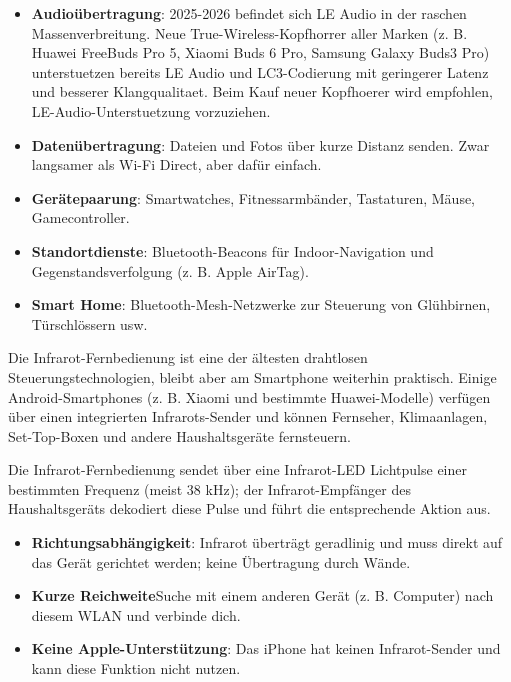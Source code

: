 
\begin{itemize}
  \item \textbf{Audioübertragung}: 2025-2026 befindet sich LE Audio in der raschen Massenverbreitung. Neue True-Wireless-Kopfhorrer aller Marken (z. B. Huawei FreeBuds Pro 5, Xiaomi Buds 6 Pro, Samsung Galaxy Buds3 Pro) unterstuetzen bereits LE Audio und LC3-Codierung mit geringerer Latenz und besserer Klangqualitaet. Beim Kauf neuer Kopfhoerer wird empfohlen, LE-Audio-Unterstuetzung vorzuziehen.
  \item \textbf{Datenübertragung}: Dateien und Fotos über kurze Distanz senden. Zwar langsamer als Wi-Fi Direct, aber dafür einfach.
  \item \textbf{Gerätepaarung}: Smartwatches, Fitnessarmbänder, Tastaturen, Mäuse, Gamecontroller.
  \item \textbf{Standortdienste}: Bluetooth-Beacons für Indoor-Navigation und Gegenstandsverfolgung (z. B. Apple AirTag).
  \item \textbf{Smart Home}: Bluetooth-Mesh-Netzwerke zur Steuerung von Glühbirnen, Türschlössern usw.
\end{itemize}


Die Infrarot-Fernbedienung ist eine der ältesten drahtlosen Steuerungstechnologien, bleibt aber am Smartphone weiterhin praktisch. Einige Android-Smartphones (z. B. Xiaomi und bestimmte Huawei-Modelle) verfügen über einen integrierten Infrarots-Sender und können Fernseher, Klimaanlagen, Set-Top-Boxen und andere Haushaltsgeräte fernsteuern.


Die Infrarot-Fernbedienung sendet über eine Infrarot-LED Lichtpulse einer bestimmten Frequenz (meist 38 kHz); der Infrarot-Empfänger des Haushaltsgeräts dekodiert diese Pulse und führt die entsprechende Aktion aus.


\begin{itemize}
  \item \textbf{Richtungsabhängigkeit}: Infrarot überträgt geradlinig und muss direkt auf das Gerät gerichtet werden; keine Übertragung durch Wände.
  \item \textbf{Kurze Reichweite}Suche mit einem anderen Gerät (z. B. Computer) nach diesem WLAN und verbinde dich.
  \item \textbf{Keine Apple-Unterstützung}: Das iPhone hat keinen Infrarot-Sender und kann diese Funktion nicht nutzen.
\end{itemize}

